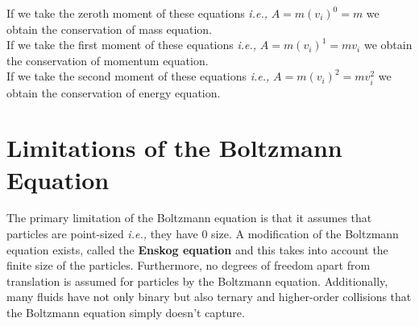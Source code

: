 \no If we take the zeroth moment of these equations \textit{i.e.,} $A = m(v_i)^0 = m$ we obtain the conservation of mass equation. \\

\no If we take the first moment of these equations \textit{i.e.,} $A = m(v_i)^1 = mv_i$ we obtain the conservation of momentum equation. \\

\no If we take the second moment of these equations \textit{i.e.,} $A = m(v_i)^2 = mv_i^2$ we obtain the conservation of energy equation.

\section{Limitations of the Boltzmann Equation}

The primary limitation of the Boltzmann equation is that it assumes that particles are point-sized \textit{i.e.,} they have 0 size. A modification of the Boltzmann equation exists, called the \textbf{Enskog equation} and this takes into account the finite size of the particles. Furthermore, no degrees of freedom apart from translation is assumed for particles by the Boltzmann equation. Additionally, many fluids have not only binary but also ternary and higher-order collisions that the Boltzmann equation simply doesn't capture.